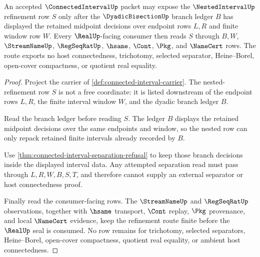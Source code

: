 \begin{theorem}
\label{thm:connectedinterval-dyadic-nesting-obligations}
An accepted $\ConnectedIntervalUp$ packet may expose the $\NestedIntervalUp$ refinement row $S$ only after the $\DyadicBisectionUp$ branch ledger $B$ has displayed the retained midpoint decisions over endpoint rows $L,R$ and finite window row $W$. Every $\RealUp$-facing consumer then reads $S$ through $B,W$, $\StreamNameUp$, $\RegSeqRatUp$, $\hsame$, $\Cont$, $\Pkg$, and $\NameCert$ rows. The route exports no host connectedness, trichotomy, selected separator, Heine--Borel, open-cover compactness, or quotient real equality.
\end{theorem}
\begin{proof}
Project the carrier of \autoref{def:connected-interval-carrier}. The nested-refinement row $S$ is not a free coordinate: it is listed downstream of the endpoint rows $L,R$, the finite interval window $W$, and the dyadic branch ledger $B$.

Read the branch ledger before reading $S$. The ledger $B$ displays the retained midpoint decisions over the same endpoints and window, so the nested row can only repack retained finite intervals already recorded by $B$.

Use \autoref{thm:connected-interval-separation-refusal} to keep those branch decisions inside the displayed interval data. Any attempted separation read must pass through $L,R,W,B,S,T$, and therefore cannot supply an external separator or host connectedness proof.

Finally read the consumer-facing rows. The $\StreamNameUp$ and $\RegSeqRatUp$ observations, together with $\hsame$ transport, $\Cont$ replay, $\Pkg$ provenance, and local $\NameCert$ evidence, keep the refinement route finite before the $\RealUp$ seal is consumed. No row remains for trichotomy, selected separators, Heine--Borel, open-cover compactness, quotient real equality, or ambient host connectedness.
\end{proof}

